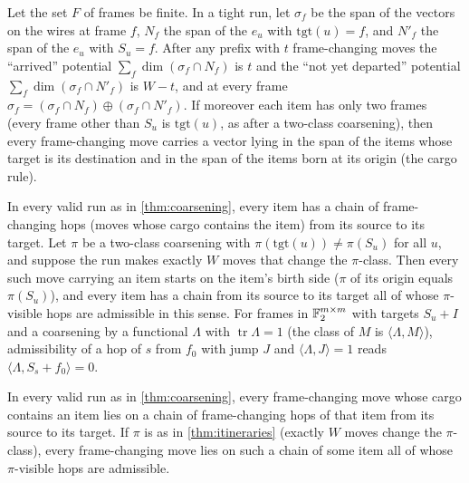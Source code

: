 \begin{theorem}\label{thm:tight}
Let the set $F$ of frames be finite. In a tight run, let $\sigma_f$ be the span of the vectors on the wires at frame $f$, $N_f$ the span of the $e_u$ with $\mathrm{tgt}(u)=f$, and $N'_f$ the span of the $e_u$ with $S_u=f$. After any prefix with $t$ frame-changing moves the ``arrived'' potential $\sum_f\dim(\sigma_f\cap N_f)$ is $t$ and the ``not yet departed'' potential $\sum_f\dim(\sigma_f\cap N'_f)$ is $W-t$, and at every frame $\sigma_f=(\sigma_f\cap N_f)\oplus(\sigma_f\cap N'_f)$. If moreover each item has only two frames (every frame other than $S_u$ is
$\mathrm{tgt}(u)$, as after a two-class coarsening), then every frame-changing move carries a vector lying in the
span of the items whose target is its destination and in the span of the items born at its origin (the cargo rule).
\end{theorem}

\begin{theorem}\label{thm:itineraries}
In every valid run as in \cref{thm:coarsening}, every item has a chain of frame-changing hops (moves whose cargo
contains the item) from its source to its target. Let $\pi$ be a two-class coarsening with
$\pi(\mathrm{tgt}(u))\ne\pi(S_u)$ for all $u$, and suppose the run makes exactly $W$ moves that change the
$\pi$-class. Then every such move carrying an item starts on the item's birth side ($\pi$ of its origin equals
$\pi(S_u)$), and every item has a chain from its source to its target all of whose $\pi$-visible hops are
admissible in this sense. For frames in $\mathbb{F}_2^{m\times m}$ with targets $S_u+I$ and a coarsening by a functional
$\Lambda$ with $\operatorname{tr}\Lambda=1$ (the class of $M$ is $\langle\Lambda,M\rangle$), admissibility of a hop of $s$
from $f_0$ with jump $J$ and $\langle\Lambda,J\rangle=1$ reads $\langle\Lambda,S_s+f_0\rangle=0$.
\end{theorem}

\begin{theorem}\label{thm:carrying}
In every valid run as in \cref{thm:coarsening}, every frame-changing move whose cargo contains an item lies on a chain of frame-changing hops of that item from its source to its target. If $\pi$ is as in \cref{thm:itineraries} (exactly $W$ moves change the $\pi$-class), every frame-changing move lies on such a chain of some item all of whose $\pi$-visible hops are admissible.
\end{theorem}

